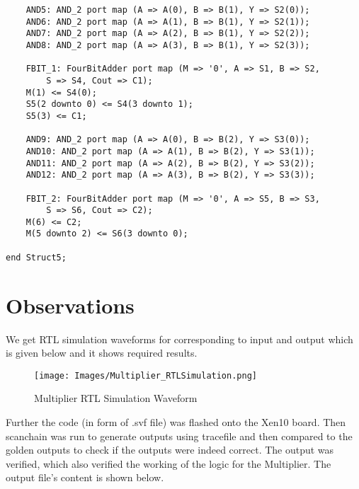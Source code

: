 \documentclass[12pt]{article}
\begin{document}
\begin{verbatim}
	AND5: AND_2 port map (A => A(0), B => B(1), Y => S2(0));
	AND6: AND_2 port map (A => A(1), B => B(1), Y => S2(1));
	AND7: AND_2 port map (A => A(2), B => B(1), Y => S2(2));
	AND8: AND_2 port map (A => A(3), B => B(1), Y => S2(3));
	
	FBIT_1: FourBitAdder port map (M => '0', A => S1, B => S2, 
		S => S4, Cout => C1);
	M(1) <= S4(0); 
	S5(2 downto 0) <= S4(3 downto 1);
	S5(3) <= C1;
	
	AND9: AND_2 port map (A => A(0), B => B(2), Y => S3(0));
	AND10: AND_2 port map (A => A(1), B => B(2), Y => S3(1));
	AND11: AND_2 port map (A => A(2), B => B(2), Y => S3(2));
	AND12: AND_2 port map (A => A(3), B => B(2), Y => S3(3));
	
	FBIT_2: FourBitAdder port map (M => '0', A => S5, B => S3, 
		S => S6, Cout => C2);
	M(6) <= C2;
	M(5 downto 2) <= S6(3 downto 0);
	
end Struct5;
\end{verbatim}

\section{Observations}
 
We get RTL simulation waveforms for corresponding to input and output which is given below and it shows required results.

\begin{figure}[H]
\centering
  \texttt{[image: Images/Multiplier\_RTLSimulation.png]}
  \caption{Multiplier RTL Simulation Waveform}
\end{figure}

Further the code (in form of .svf file) was flashed onto the Xen10 board. Then scanchain was run to generate outputs using tracefile and then compared to the golden outputs to check if the outputs were indeed correct. The output was verified, which also verified the working of the logic for the Multiplier. The output file's content is shown below.
\end{document}
